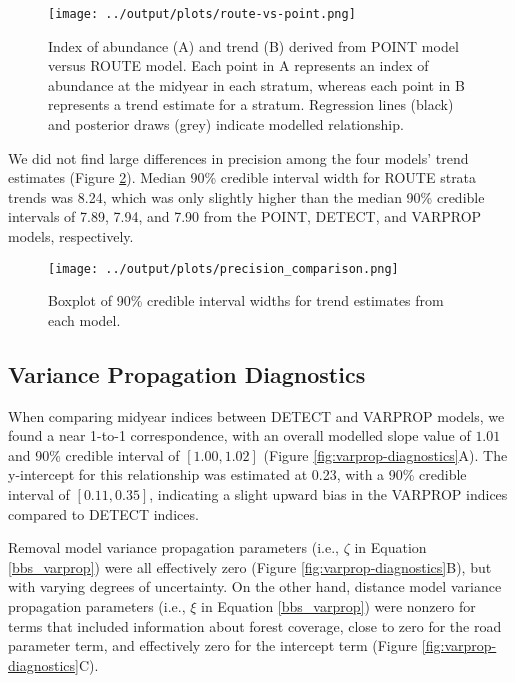 \documentclass[12pt]{article}
\begin{document}
\begin{figure}[h]
	\texttt{[image: ../output/plots/route-vs-point.png]}
	\caption{Index of abundance (A) and trend (B) derived from POINT model versus ROUTE model. Each point in A represents an index of abundance at the midyear in each stratum, whereas each point in B represents a trend estimate for a stratum. Regression lines (black) and posterior draws (grey) indicate modelled relationship.}
	\label{fig:route-vs-point}
\end{figure}

\par We did not find large differences in precision among the four models' trend estimates (Figure \ref{fig:precision}).
Median 90\% credible interval width for ROUTE strata trends was 8.24, which was only slightly higher than the median 90\% credible intervals of 7.89, 7.94, and 7.90 from the POINT, DETECT, and VARPROP models, respectively. 


\begin{figure}[h]
	\texttt{[image: ../output/plots/precision\_comparison.png]}
	\caption{Boxplot of 90\% credible interval widths for trend estimates from each model.}
	\label{fig:precision}
\end{figure}

\subsection{Variance Propagation Diagnostics}

\par When comparing midyear indices between DETECT and VARPROP models, we found a near 1-to-1 correspondence, with an overall modelled slope value of $1.01$ and 90\% credible interval of $[1.00, 1.02]$ (Figure \ref{fig:varprop-diagnostics}A).
The y-intercept for this relationship was estimated at 0.23, with a 90\% credible interval of $[0.11, 0.35]$, indicating a slight upward bias in the VARPROP indices compared to DETECT indices.

\par Removal model variance propagation parameters (i.e., $\zeta$ in Equation \ref{bbs_varprop}) were all effectively zero (Figure \ref{fig:varprop-diagnostics}B), but with varying degrees of uncertainty.
On the other hand, distance model variance propagation parameters (i.e., $\xi$ in Equation \ref{bbs_varprop}) were nonzero for terms that included information about forest coverage, close to zero for the road parameter term, and effectively zero for the intercept term (Figure \ref{fig:varprop-diagnostics}C).
\end{document}
